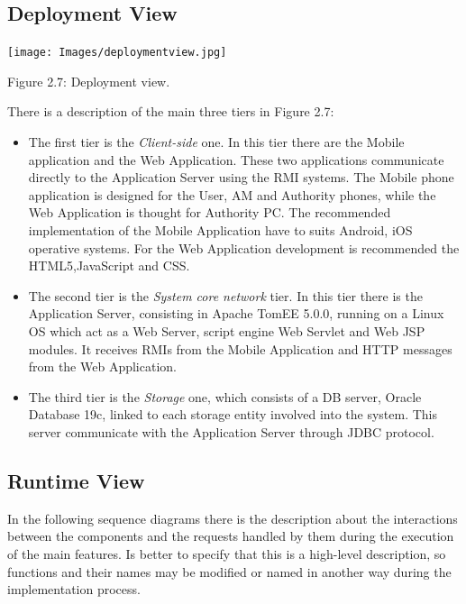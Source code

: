\documentclass[12pt]{article}
\begin{document}
\newpage
\subsection{Deployment View}




\begin{center}
\texttt{[image: Images/deploymentview.jpg]}


\vspace{2mm}
Figure 2.7: Deployment view.
\end{center}
\vspace{3mm}
There is a description of the main three tiers in Figure 2.7:

\begin{itemize}
\item The first tier is the \emph{Client-side} one. In this tier there are the Mobile application and the Web Application. These two applications communicate directly to the Application Server using the RMI systems. The Mobile phone application is designed for the User, AM and Authority phones, while the Web Application is thought for Authority PC. The recommended implementation of the Mobile Application have to suits  Android, iOS operative systems. For the Web Application development is recommended the HTML5,JavaScript and CSS.
\item The second tier is the \emph{System core network} tier. In this tier there is the Application Server, consisting in Apache TomEE 5.0.0, running on a Linux OS which act as a Web Server, script engine Web Servlet and Web JSP modules. It receives RMIs from the Mobile Application and HTTP messages from the Web Application.
\item The third tier is the \emph{Storage} one, which consists of a DB server, Oracle Database 19c, linked to each storage entity involved into the system. This server communicate with the Application Server through JDBC protocol.
\end{itemize}
\vspace{5mm}

\subsection{Runtime View}
\vspace{5mm}

In the following sequence diagrams there is the description about the interactions between the components and the requests handled by them during the execution of the main features. Is better to specify that this is a high-level description, so functions and their names may be modified or named in another way  during the implementation process.
\end{document}
